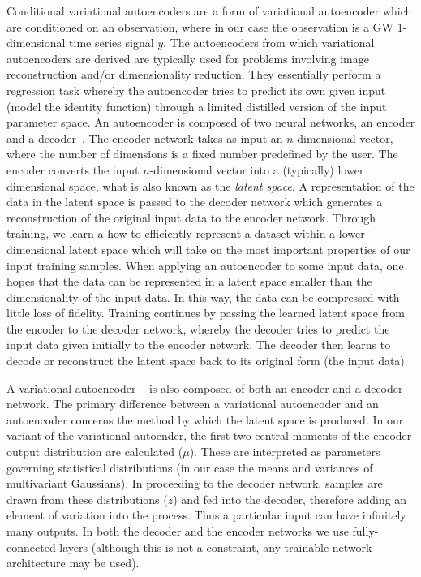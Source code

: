 \documentclass[%
showpacs,
 amsmath,amssymb,
 aps,
 twocolumn,
 prl,
 reprint,
floatfix,
]{revtex4-1}
\begin{document}
%
%
Conditional variational autoencoders are a form of variational autoencoder
which are conditioned on an observation, where in our case the observation is a
\ac{GW} 1-dimensional time series signal $y$. The autoencoders from which
variational autoencoders are derived are typically used for problems involving
image reconstruction and/or dimensionality reduction. They essentially perform
a regression task whereby the autoencoder tries to predict its own given input
(model the identity function) through a limited distilled version of the input
parameter space. An autoencoder is composed of two neural networks, an encoder
and a decoder~\cite{LIOU20083150}. The encoder network takes as input an
$n$-dimensional vector, where the number of dimensions is a fixed number
predefined by the user. The encoder converts the input $n$-dimensional vector
into a (typically) lower dimensional space, what is also known as the
{\it{latent space}}. A representation of the data in the latent space is passed
to the decoder network which generates a reconstruction of the original input
data to the encoder network. Through training, we learn a how to efficiently
represent a dataset within a lower dimensional latent space which will take on
the most important properties of our input training samples. When applying an
autoencoder to some input data, one hopes that the data can be represented in a
latent space smaller than the dimensionality of the input data.  In this way,
the data can be compressed with little loss of fidelity. Training continues by
passing the learned latent space from the encoder to the decoder network,
whereby the decoder tries to predict the input data given initially to the
encoder network. The decoder then learns to decode or reconstruct the latent
space back to its original form (the input data). 

%
%
A variational autoencoder ~\cite{1812.04405} is also composed of both an
encoder and a decoder network. The primary difference between a variational
autoencoder and an autoencoder concerns the method by which the latent space is
produced. In our variant of the variational autoender, the first two central
moments of the encoder output distribution are calculated ($\mu$). These are
interpreted as parameters governing statistical distributions (in our case the
means and variances of multivariant Gaussians). In proceeding to the decoder
network, samples are drawn from these distributions ($z$) and fed into the
decoder, therefore adding an element of variation into the process.  Thus a
particular input can have infinitely many outputs. In both the decoder and the
encoder networks we use fully-connected layers (although this is not a
constraint, any trainable network architecture may be used).
\end{document}

